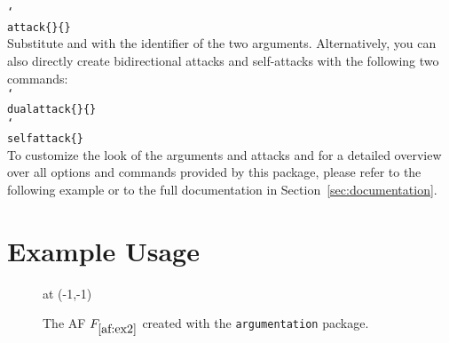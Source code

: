 \documentclass{scrartcl}
\newcommand{\argumentation}{\texttt{argumentation}\xspace}
\newcommand{\mopt}[2][red]{\textcolor{#1}{\ttfamily \meta{#2}}}
\DeclareRobustCommand\cs[2][-1.6cm]{\hspace{#1}\texttt{\char`\\#2}}
\begin{document}
\noindent\cs[0cm]{attack\{\mopt{a1}\}\{\mopt{a2}\}}\\

\noindent
Substitute \mopt{a1} and \mopt{a2} with the identifier of the two arguments.
Alternatively, you can also directly create bidirectional attacks and self-attacks with the following two commands:\\

\noindent\cs[0cm]{dualattack\{\mopt{a1}\}\{\mopt{a2}\}}\\
\noindent\cs[0cm]{selfattack\{\mopt{a1}\}}\\


To customize the look of the arguments and attacks and for a detailed overview over all options and commands provided by this package, please refer to the following example or to the full documentation in Section~\ref{sec:documentation}.


\newpage
\section{Example Usage}\label{sec:example}
\vspace{-0.5cm}
\begin{figure}[ht]
    \centering
    \begin{af}[namestyle=math]


         at (-1,-1)

        

        \label{af:ex2}
    \end{af}
    \caption{The AF $F_{\ref{af:ex2}}$ created with the \argumentation package.}
    \label{fig:example}
\end{figure}
\end{document}
